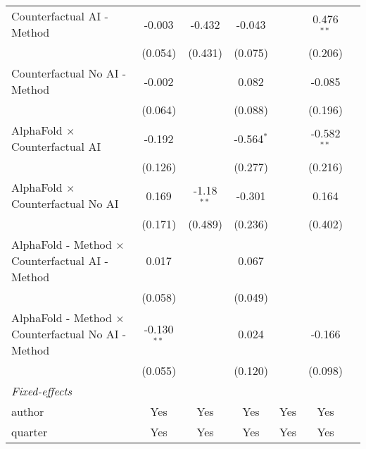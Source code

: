 \begin{tabular}{lcccccc}
   Counterfactual AI - Method                                 & -0.003        & -0.432        & -0.043       &         & 0.476$^{**}$  &   \\   
                                                              & (0.054)       & (0.431)       & (0.075)      &         & (0.206)       &   \\   
   Counterfactual No AI - Method                              & -0.002        &               & 0.082        &         & -0.085        &   \\   
                                                              & (0.064)       &               & (0.088)      &         & (0.196)       &   \\   
   AlphaFold $\times$ Counterfactual AI                       & -0.192        &               & -0.564$^{*}$ &         & -0.582$^{**}$ &   \\   
                                                              & (0.126)       &               & (0.277)      &         & (0.216)       &   \\   
   AlphaFold $\times$ Counterfactual No AI                    & 0.169         & -1.18$^{**}$  & -0.301       &         & 0.164         &   \\   
                                                              & (0.171)       & (0.489)       & (0.236)      &         & (0.402)       &   \\   
   AlphaFold - Method $\times$ Counterfactual AI - Method     & 0.017         &               & 0.067        &         &               &   \\   
                                                              & (0.058)       &               & (0.049)      &         &               &   \\   
   AlphaFold - Method $\times$ Counterfactual No AI - Method  & -0.130$^{**}$ &               & 0.024        &         & -0.166        &   \\   
                                                              & (0.055)       &               & (0.120)      &         & (0.098)       &   \\   
   \midrule
   \emph{Fixed-effects}\\
   author                                                     & Yes           & Yes           & Yes          & Yes     & Yes           & \\  
   quarter                                                    & Yes           & Yes           & Yes          & Yes     & Yes           & \\  

\end{tabular}

